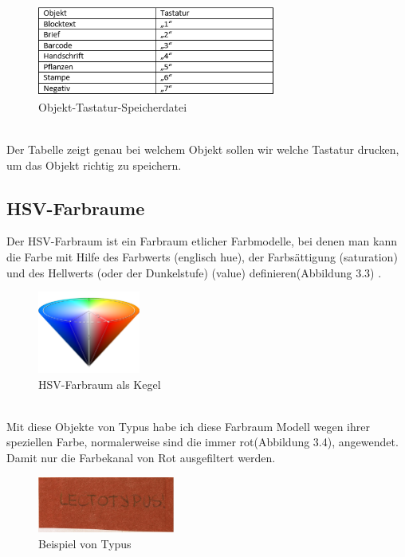 \documentclass[10pt,a4paper]{report}
\begin{document}
\begin{figure}[htbp] 
	\centering
	\includegraphics[width=0.7\textwidth]{Tabelle.png}
	\caption{Objekt-Tastatur-Speicherdatei}
	\label{fig:Tabelle 1}
\end{figure}\\
Der Tabelle zeigt genau bei welchem Objekt sollen wir welche Tastatur drucken, um das Objekt richtig zu speichern.

\subsection{HSV-Farbraume}
Der HSV-Farbraum ist ein Farbraum etlicher Farbmodelle, bei denen man kann die Farbe mit Hilfe des Farbwerts (englisch hue), der Farbsättigung (saturation) und des Hellwerts (oder der Dunkelstufe) (value) definieren(Abbildung 3.3) \cite{7}. \\ 
\begin{figure}[htbp] 
	\centering
	\includegraphics[width=0.3\textwidth]{HSV_cone.png}
	\caption{HSV-Farbraum als Kegel}
	\label{fig:Bild 3}
\end{figure}\\
Mit diese Objekte von Typus habe ich diese Farbraum Modell wegen ihrer speziellen Farbe, normalerweise sind die immer rot(Abbildung 3.4), angewendet. Damit nur die Farbekanal von Rot ausgefiltert werden.\\
\begin{figure}[htbp] 
	\centering
	\includegraphics[width=0.4\textwidth]{test.jpg}
	\caption{Beispiel von Typus}
	\label{fig:Bild 4}
\end{figure}
\end{document}
